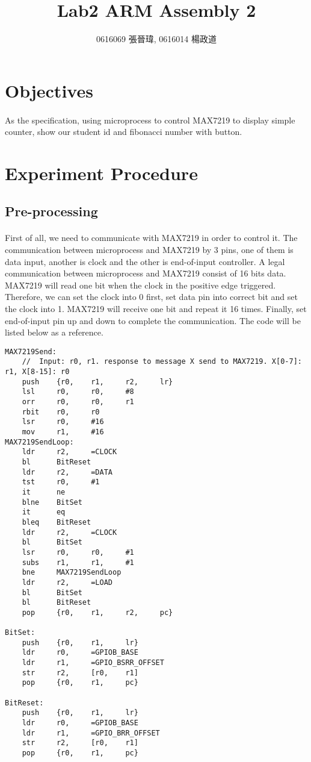 \title{Lab2 ARM Assembly 2}
\author{0616069 張晉瑋, 0616014 楊政道}
\maketitle
\thispagestyle{fancy}
\section{Objectives}
\paragraph{}
As the specification, using microprocess to control MAX7219 to display simple counter, show our student id and fibonacci number with button.
\section{Experiment Procedure}
\subsection{Pre-processing}
\paragraph{}
First of all, we need to communicate with MAX7219 in order to control it. The communication between microprocess and MAX7219 by 3 pins, one of them is data input, another is clock and the other is end-of-input controller. A legal communication between microprocess and MAX7219 consist of 16 bits data. MAX7219 will read one bit when the clock in the positive edge triggered. Therefore, we can set the clock into 0 first, set data pin into correct bit and set the clock into 1. MAX7219 will receive one bit and repeat it 16 times. Finally, set end-of-input pin up and down to complete the communication. The code will be listed below as a reference.
\begin{lstlisting}
MAX7219Send:
    //  Input: r0, r1. response to message X send to MAX7219. X[0-7]: r1, X[8-15]: r0
    push    {r0,    r1,     r2,     lr}
    lsl     r0,     r0,     #8
    orr     r0,     r0,     r1
    rbit    r0,     r0
    lsr     r0,     #16
    mov     r1,     #16
MAX7219SendLoop:
    ldr     r2,     =CLOCK
    bl      BitReset
    ldr     r2,     =DATA
    tst     r0,     #1
    it      ne
    blne    BitSet
    it      eq
    bleq    BitReset
    ldr     r2,     =CLOCK
    bl      BitSet
    lsr     r0,     r0,     #1
    subs    r1,     r1,     #1
    bne     MAX7219SendLoop
    ldr     r2,     =LOAD
    bl      BitSet
    bl      BitReset
    pop     {r0,    r1,     r2,     pc}

BitSet:
    push    {r0,    r1,     lr}
    ldr     r0,     =GPIOB_BASE
    ldr     r1,     =GPIO_BSRR_OFFSET
    str     r2,     [r0,    r1]
    pop     {r0,    r1,     pc}

BitReset:
    push    {r0,    r1,     lr}
    ldr     r0,     =GPIOB_BASE
    ldr     r1,     =GPIO_BRR_OFFSET
    str     r2,     [r0,    r1]
    pop     {r0,    r1,     pc}
\end{lstlisting}
